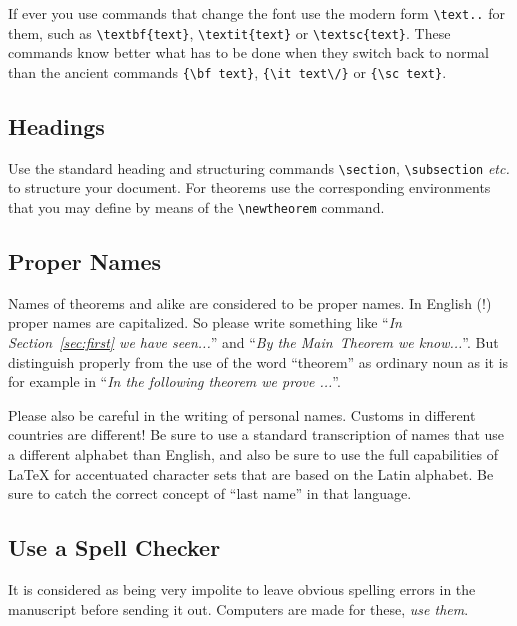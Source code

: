 \documentclass[
submission
]{dmtcs-episciences}
\begin{document}
If ever you use commands that change the font use the modern form
\verb!\text..! for them, such as \verb!\textbf{text}!,
\verb!\textit{text}! or \verb!\textsc{text}!. These commands know
better what has to be done when they switch back to normal than the
ancient commands \verb!{\bf text}!, \verb!{\it text\/}! or
\verb!{\sc text}!.

\subsection{Headings}
\label{sec:headings}
Use the standard heading and structuring commands \verb!\section!,
\verb!\subsection! \textit{etc.} to structure your document. For
theorems use the corresponding environments that you may define by
means of the \verb!\newtheorem! command.

\subsection{Proper Names}
\label{sec:names}
Names of theorems and alike are considered to be proper names. In
English (!) proper names are capitalized. So please write
something like ``\emph{In Section~\ref{sec:first} we have seen...}''
and ``\emph{By the Main~Theorem we know...}''. But distinguish
properly from the use of the word ``theorem'' as ordinary noun as it
is for example in ``\emph{In the following theorem we prove ...}''.

Please also be careful in the writing of personal names. Customs in
different countries are different! Be sure to use a standard
transcription of names that use a different alphabet than English, and
also be sure to use the full capabilities of \LaTeX{} for accentuated
character sets that are based on the Latin alphabet. Be sure to catch
the correct concept of ``last name'' in that language.


\subsection{Use a Spell Checker}
\label{sec:check}

It is considered as being very impolite to leave obvious spelling
errors in the manuscript before sending it out. Computers are made for 
these, \emph{use them}.
\end{document}

